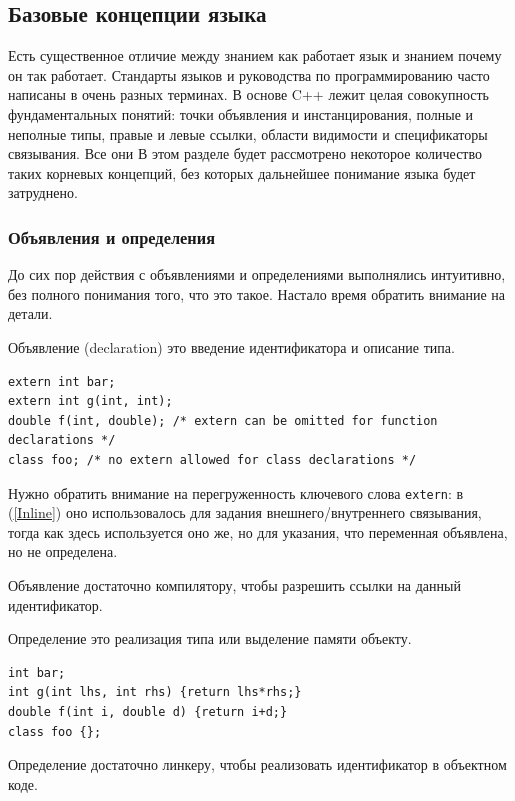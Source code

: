 \documentclass[a4paper,12pt,oneside]{article}
\begin{document}
\pagebreak
\subsection{Базовые концепции языка}\label{BasicTerms}

Есть существенное отличие между знанием как работает язык и знанием почему он так работает. Стандарты языков и руководства по программированию часто написаны в очень разных терминах. В основе C++ лежит целая совокупность фундаментальных понятий: точки объявления и инстанцирования, полные и неполные типы, правые и левые ссылки, области видимости и спецификаторы связывания. Все они  В этом разделе будет рассмотрено некоторое количество таких корневых концепций, без которых дальнейшее понимание языка будет затруднено.

\subsubsection{Объявления и определения}\label{DeclVsDef}

До сих пор действия с объявлениями и определениями выполнялись интуитивно, без полного понимания того, что это такое. Настало время обратить внимание на детали.

Объявление (declaration) это введение идентификатора и описание типа.

\begin{lstlisting}
extern int bar;
extern int g(int, int);
double f(int, double); /* extern can be omitted for function declarations */
class foo; /* no extern allowed for class declarations */
\end{lstlisting}

Нужно обратить внимание на перегруженность ключевого слова \lstinline!extern!: в (\ref{Inline}) оно использовалось для задания внешнего/внутреннего связывания, тогда как здесь используется оно же, но для указания, что переменная объявлена, но не определена.

Объявление достаточно компилятору, чтобы разрешить ссылки на данный идентификатор. 

Определение это реализация типа или выделение памяти объекту.

\begin{lstlisting}
int bar;
int g(int lhs, int rhs) {return lhs*rhs;}
double f(int i, double d) {return i+d;}
class foo {};
\end{lstlisting}

Определение достаточно линкеру, чтобы реализовать идентификатор в объектном коде. 
\end{document}
